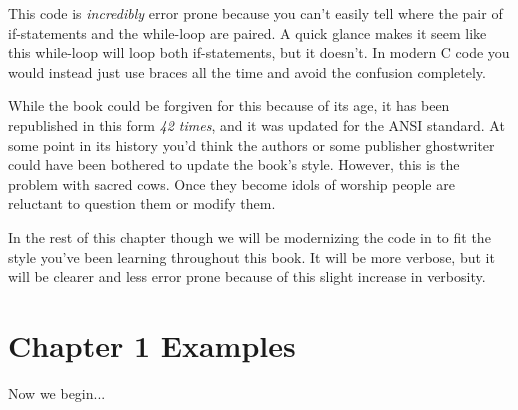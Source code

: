 This code is \emph{incredibly} error prone because you can't easily tell
where the pair of if-statements and the while-loop are paired.  A quick
glance makes it seem like this while-loop will loop both if-statements,
but it doesn't.  In modern C code you would instead just use braces all
the time and avoid the confusion completely.

While the book could be forgiven for this because of its age, it has been
republished in this form \emph{42 times}, and it was updated for the ANSI
standard.  At some point in its history you'd think the authors or some
publisher ghostwriter could have been bothered to update the book's style.
However, this is the problem with sacred cows.  Once they become idols of
worship people are reluctant to question them or modify them.

In the rest of this chapter though we will be modernizing the code in \krc
to fit the style you've been learning throughout this book.  It will be
more verbose, but it will be clearer and less error prone because of
this slight increase in verbosity.


\section{Chapter 1 Examples}

Now we begin...
